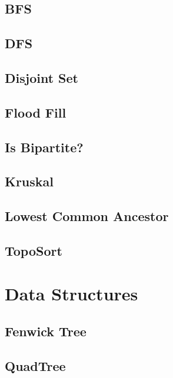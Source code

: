 \documentclass[twocolumn]{article}
\begin{document}
\subsection{BFS}
\raggedbottom
\hrulefill
\subsection{DFS}
\raggedbottom
\hrulefill
\subsection{Disjoint Set}
\raggedbottom
\hrulefill
\subsection{Flood Fill}
\raggedbottom
\hrulefill
\subsection{Is Bipartite?}
\raggedbottom
\hrulefill
\subsection{Kruskal}
\raggedbottom
\hrulefill
\subsection{Lowest Common Ancestor}
\raggedbottom
\hrulefill
\subsection{TopoSort}
\raggedbottom
\hrulefill

\section{Data Structures}
\subsection{Fenwick Tree}
\raggedbottom
\hrulefill
\subsection{QuadTree}
\raggedbottom
\hrulefill
\end{document}
